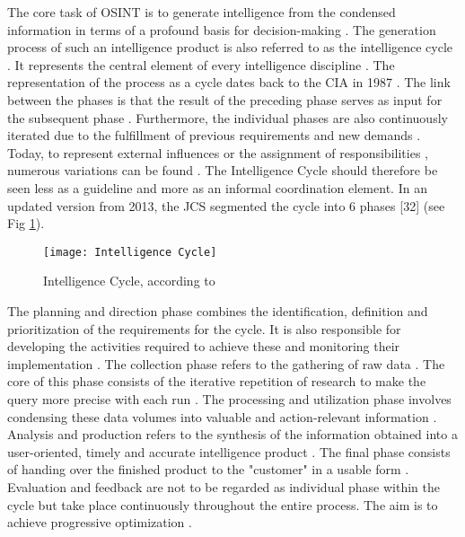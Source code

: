\documentclass[10pt]{article}
\begin{document}
The core task of OSINT is to generate intelligence \cite{Hwang.2022,Dokman.2020}
from the condensed information in terms of a profound basis for decision-making
\cite{Breakspear.2013,May.2020}. The generation process of such an intelligence product
is also referred to as the intelligence cycle \cite{HerreraCubides.2020, CentralIntelligenceAgency.1987}.
It represents the central element of every intelligence discipline \cite{Reuser.2017,Dokman.2020}.
The representation of the process as a cycle \cite{DirectorofNationalIntelligence.2011} dates
back to the CIA in 1987 \cite{CentralIntelligenceAgency.1987}. The link between the phases is that
the result of the preceding phase serves as input for the subsequent phase
\cite{JointChiefsofStaffU.S.Army.2013,Pellissier.2013}. Furthermore, the individual phases are also continuously
iterated due to the fulfillment of previous requirements and new demands \cite{Gibson.2016}.
Today, to represent external influences or the
assignment of responsibilities \cite{Lowenthal.2020,Phythian.2013,Johnston.2005}, numerous
variations can be found \cite{Bohm.2021,Reuser.2017}. The
Intelligence Cycle should therefore be seen less as a guideline and more as an informal
coordination element\cite{Hwang.2022}.
In an updated version from 2013, the JCS segmented the cycle into 6 phases [32] (see Fig \ref{fig: intelligence cycle}).

\begin{figure}[h]
    \centering
    \texttt{[image: Intelligence Cycle]}
    \caption{Intelligence Cycle, according to \cite{JointChiefsofStaffU.S.Army.2013}}
    \label{fig: intelligence cycle}
\end{figure}

The planning and direction phase combines the identification, definition and prioritization
of the requirements for the cycle. It is also responsible for developing the activities
required to achieve these \cite{DepartmentoftheArmy.2012} and monitoring their implementation
\cite{JointChiefsofStaffU.S.Army.2013, DepartmentoftheArmy.2012}.
The collection phase refers to the gathering of raw data \cite{CentralIntelligenceAgency.1987}.
The core of this phase consists of the iterative repetition of research
\cite{NorthAtlanticTreatyOrganization.2001} to make the query more precise with each run
\cite{PastorGalindo.2020}. The processing and utilization phase involves condensing
these data volumes into valuable and action-relevant information
\cite{DirectorofNationalIntelligence.2011, JointChiefsofStaffU.S.Army.2013, PastorGalindo.2020}.
Analysis and production refers to the synthesis of the information obtained into a
user-oriented, timely and accurate intelligence product
\cite{DepartmentoftheArmy.2012, Hwang.2022, NorthAtlanticTreatyOrganization.2001}.
The final phase consists of handing over the finished product to the "customer" in a
usable form \cite{CentralIntelligenceAgency.2023, DepartmentoftheArmy.2012, Williams.2018}.
Evaluation and feedback are not to be regarded as individual phase within the cycle
but take place continuously throughout the entire process. The aim is to achieve progressive optimization
\cite{DirectorofNationalIntelligence.2011, JointChiefsofStaffU.S.Army.2013, NorthAtlanticTreatyOrganization.2001}.
\end{document}
